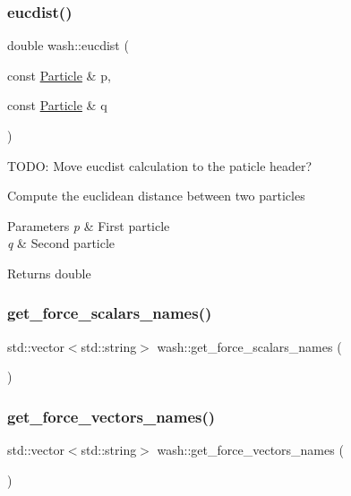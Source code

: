 \subsubsection{\texorpdfstring{eucdist()}{eucdist()}}
{\footnotesize\ttfamily double wash\+::eucdist (\begin{DoxyParamCaption}\item[{const \mbox{\hyperlink{classwash_1_1Particle}{Particle}} \&}]{p,  }\item[{const \mbox{\hyperlink{classwash_1_1Particle}{Particle}} \&}]{q }\end{DoxyParamCaption})}



T\+O\+DO\+: Move eucdist calculation to the paticle header? 

Compute the euclidean distance between two particles


\begin{DoxyParams}{Parameters}
{\em p} & First particle \\
\hline
{\em q} & Second particle \\
\hline
\end{DoxyParams}
\begin{DoxyReturn}{Returns}
double 
\end{DoxyReturn}
\mbox{\label{namespacewash_aaf7c907c156c086ad032365076e04b92}} 
\subsubsection{\texorpdfstring{get\+\_\+force\+\_\+scalars\+\_\+names()}{get\_force\_scalars\_names()}}
{\footnotesize\ttfamily std\+::vector$<$std\+::string$>$ wash\+::get\+\_\+force\+\_\+scalars\+\_\+names (\begin{DoxyParamCaption}{ }\end{DoxyParamCaption})}

\mbox{\label{namespacewash_ae42fc803544c64f176f65f72e0fc1fe0}} 
\subsubsection{\texorpdfstring{get\+\_\+force\+\_\+vectors\+\_\+names()}{get\_force\_vectors\_names()}}
{\footnotesize\ttfamily std\+::vector$<$std\+::string$>$ wash\+::get\+\_\+force\+\_\+vectors\+\_\+names (\begin{DoxyParamCaption}{ }\end{DoxyParamCaption})}

